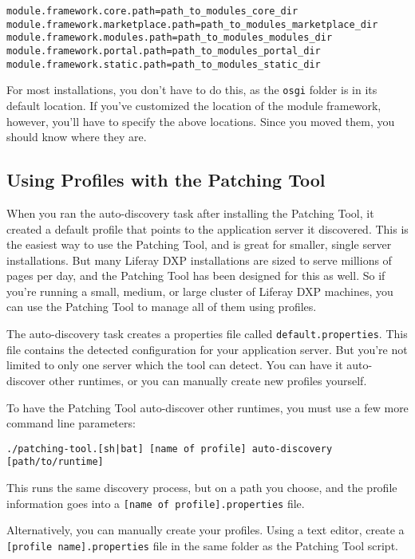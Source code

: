 \begin{verbatim}
module.framework.core.path=path_to_modules_core_dir
module.framework.marketplace.path=path_to_modules_marketplace_dir
module.framework.modules.path=path_to_modules_modules_dir
module.framework.portal.path=path_to_modules_portal_dir
module.framework.static.path=path_to_modules_static_dir
\end{verbatim}

For most installations, you don't have to do this, as the \texttt{osgi}
folder is in its default location. If you've customized the location of
the module framework, however, you'll have to specify the above
locations. Since you moved them, you should know where they are.

\subsection{Using Profiles with the Patching
Tool}\label{using-profiles-with-the-patching-tool}

When you ran the auto-discovery task after installing the Patching Tool,
it created a default profile that points to the application server it
discovered. This is the easiest way to use the Patching Tool, and is
great for smaller, single server installations. But many Liferay DXP
installations are sized to serve millions of pages per day, and the
Patching Tool has been designed for this as well. So if you're running a
small, medium, or large cluster of Liferay DXP machines, you can use the
Patching Tool to manage all of them using profiles.

The auto-discovery task creates a properties file called
\texttt{default.properties}. This file contains the detected
configuration for your application server. But you're not limited to
only one server which the tool can detect. You can have it auto-discover
other runtimes, or you can manually create new profiles yourself.

To have the Patching Tool auto-discover other runtimes, you must use a
few more command line parameters:

\begin{verbatim}
./patching-tool.[sh|bat] [name of profile] auto-discovery [path/to/runtime]
\end{verbatim}

This runs the same discovery process, but on a path you choose, and the
profile information goes into a
\texttt{{[}name\ of\ profile{]}.properties} file.

Alternatively, you can manually create your profiles. Using a text
editor, create a \texttt{{[}profile\ name{]}.properties} file in the
same folder as the Patching Tool script.

